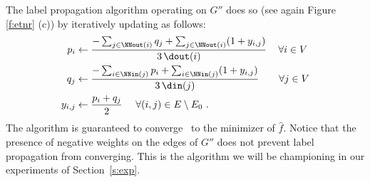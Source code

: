 \fi
%
%
The label propagation algorithm operating on $G''$ does so (see again Figure \ref{f:etnr} (c)) by iteratively updating as follows:
%
\begin{align*}
	p_{i}  & \leftarrow \frac{-\sum_{j \in \NNout(i)} q_{j} + \sum_{j \in \NNout(i)} (1+y_{i,j})}{3\,\dout(i)}\,\quad\forall i\in V\\ 
	q_{j}  & \leftarrow \frac{-\sum_{i \in  \NNin(j)} p_{i} + \sum_{i \in \NNin(j) } (1+y_{i,j})}{3\,\din(j)}\qquad\forall j \in V\\
  y_{i,j} & \leftarrow \frac{p_i + q_j}{2}~ \quad \forall (i,j) \in E\setminus E_0~.
\end{align*}
%
The algorithm is guaranteed to converge~\cite{LabelPropa03} to the minimizer of ${\widehat f}$. Notice that the presence of negative weights on the edges of $G''$ does not prevent label propagation from converging. 
This is the algorithm we will be championing in our experiments of Section~\ref{s:exp}.


% 



